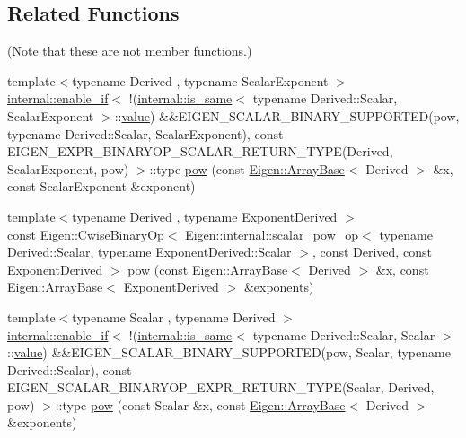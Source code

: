 \subsection*{Related Functions}
(Note that these are not member functions.) \begin{DoxyCompactItemize}
\item 
{\footnotesize template$<$typename Derived , typename Scalar\+Exponent $>$ }\\\mbox{\hyperlink{struct_eigen_1_1internal_1_1enable__if}{internal\+::enable\+\_\+if}}$<$ !(\mbox{\hyperlink{struct_eigen_1_1internal_1_1is__same}{internal\+::is\+\_\+same}}$<$ typename Derived\+::\+Scalar, Scalar\+Exponent $>$\+::\mbox{\hyperlink{class_eigen_1_1_dense_base_a8da735a6bfc7012606acf787156d10a0}{value}}) \&\&E\+I\+G\+E\+N\+\_\+\+S\+C\+A\+L\+A\+R\+\_\+\+B\+I\+N\+A\+R\+Y\+\_\+\+S\+U\+P\+P\+O\+R\+T\+ED(pow, typename Derived\+::\+Scalar, Scalar\+Exponent), const E\+I\+G\+E\+N\+\_\+\+E\+X\+P\+R\+\_\+\+B\+I\+N\+A\+R\+Y\+O\+P\+\_\+\+S\+C\+A\+L\+A\+R\+\_\+\+R\+E\+T\+U\+R\+N\+\_\+\+T\+Y\+PE(Derived, Scalar\+Exponent, pow) $>$\+::type \mbox{\hyperlink{class_eigen_1_1_array_base_ab6dc101d82e8228a19a8840e3a29c1c9}{pow}} (const \mbox{\hyperlink{class_eigen_1_1_array_base}{Eigen\+::\+Array\+Base}}$<$ Derived $>$ \&x, const Scalar\+Exponent \&exponent)
\item 
{\footnotesize template$<$typename Derived , typename Exponent\+Derived $>$ }\\const \mbox{\hyperlink{class_eigen_1_1_cwise_binary_op}{Eigen\+::\+Cwise\+Binary\+Op}}$<$ \mbox{\hyperlink{struct_eigen_1_1internal_1_1scalar__pow__op}{Eigen\+::internal\+::scalar\+\_\+pow\+\_\+op}}$<$ typename Derived\+::\+Scalar, typename Exponent\+Derived\+::\+Scalar $>$, const Derived, const Exponent\+Derived $>$ \mbox{\hyperlink{class_eigen_1_1_array_base_acb769e1ab1d809abb77c7ab98021ad81}{pow}} (const \mbox{\hyperlink{class_eigen_1_1_array_base}{Eigen\+::\+Array\+Base}}$<$ Derived $>$ \&x, const \mbox{\hyperlink{class_eigen_1_1_array_base}{Eigen\+::\+Array\+Base}}$<$ Exponent\+Derived $>$ \&exponents)
\item 
{\footnotesize template$<$typename Scalar , typename Derived $>$ }\\\mbox{\hyperlink{struct_eigen_1_1internal_1_1enable__if}{internal\+::enable\+\_\+if}}$<$ !(\mbox{\hyperlink{struct_eigen_1_1internal_1_1is__same}{internal\+::is\+\_\+same}}$<$ typename Derived\+::\+Scalar, Scalar $>$\+::\mbox{\hyperlink{class_eigen_1_1_dense_base_a8da735a6bfc7012606acf787156d10a0}{value}}) \&\&E\+I\+G\+E\+N\+\_\+\+S\+C\+A\+L\+A\+R\+\_\+\+B\+I\+N\+A\+R\+Y\+\_\+\+S\+U\+P\+P\+O\+R\+T\+ED(pow, Scalar, typename Derived\+::\+Scalar), const E\+I\+G\+E\+N\+\_\+\+S\+C\+A\+L\+A\+R\+\_\+\+B\+I\+N\+A\+R\+Y\+O\+P\+\_\+\+E\+X\+P\+R\+\_\+\+R\+E\+T\+U\+R\+N\+\_\+\+T\+Y\+PE(Scalar, Derived, pow) $>$\+::type \mbox{\hyperlink{class_eigen_1_1_array_base_a7db6f1ad242a31a2fa421f500d1258c5}{pow}} (const Scalar \&x, const \mbox{\hyperlink{class_eigen_1_1_array_base}{Eigen\+::\+Array\+Base}}$<$ Derived $>$ \&exponents)
\end{DoxyCompactItemize}
